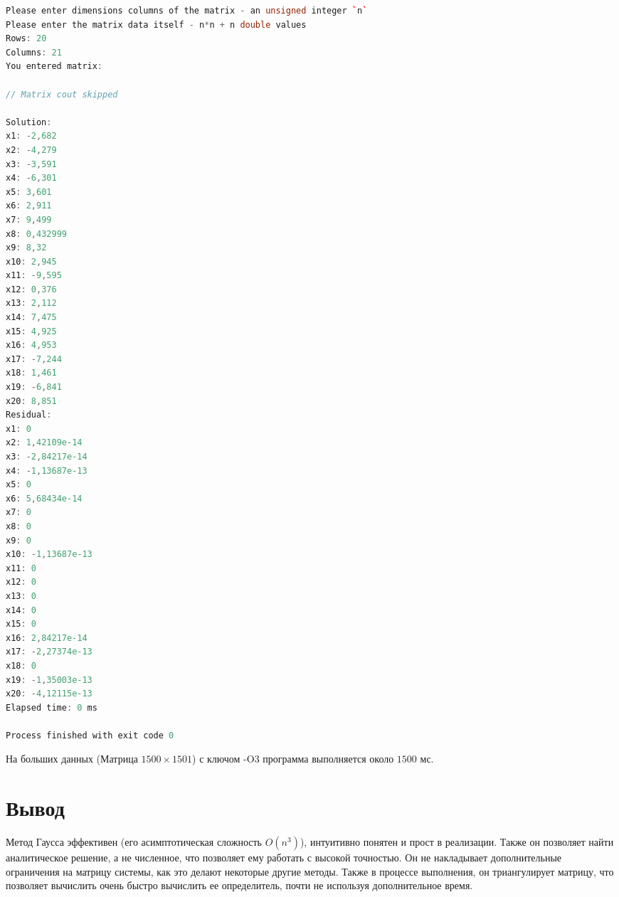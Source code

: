 \documentclass[12pt]{article}
\begin{document}
\begin{adjustbox}{width=\textwidth, center}
\begin{lstlisting}[language=C++, caption=Ввод из файла]
Please enter dimensions columns of the matrix - an unsigned integer `n`
Please enter the matrix data itself - n*n + n double values
Rows: 20
Columns: 21
You entered matrix:

// Matrix cout skipped

Solution:
x1: -2,682
x2: -4,279
x3: -3,591
x4: -6,301
x5: 3,601
x6: 2,911
x7: 9,499
x8: 0,432999
x9: 8,32
x10: 2,945
x11: -9,595
x12: 0,376
x13: 2,112
x14: 7,475
x15: 4,925
x16: 4,953
x17: -7,244
x18: 1,461
x19: -6,841
x20: 8,851
Residual:
x1: 0
x2: 1,42109e-14
x3: -2,84217e-14
x4: -1,13687e-13
x5: 0
x6: 5,68434e-14
x7: 0
x8: 0
x9: 0
x10: -1,13687e-13
x11: 0
x12: 0
x13: 0
x14: 0
x15: 0
x16: 2,84217e-14
x17: -2,27374e-13
x18: 0
x19: -1,35003e-13
x20: -4,12115e-13
Elapsed time: 0 ms

Process finished with exit code 0


\end{lstlisting}
\end{adjustbox}

На больших данных (Матрица $1500 \times 1501$) с ключом -O3 программа выполняется около $1500$ мс.

\section{Вывод}
Метод Гаусса эффективен (его асимптотическая сложность $O(n^3)$), интуитивно понятен и прост в реализации. Также он позволяет найти аналитическое решение, а не численное, что позволяет ему работать с высокой точностью. Он не накладывает дополнительные ограничения на матрицу системы, как это делают некоторые другие методы. Также в процессе выполнения, он триангулирует матрицу, что позволяет вычислить очень быстро вычислить ее определитель, почти не используя дополнительное время.
\end{document}
